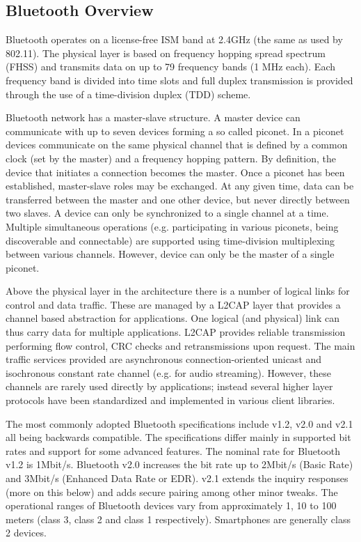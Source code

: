 \subsection{Bluetooth Overview}

Bluetooth operates on a license-free ISM band at 2.4GHz (the same as used by 802.11). The physical layer is based on frequency hopping spread spectrum (FHSS) and transmits data on up to 79 frequency bands (1 MHz each). Each frequency band is divided into time slots and full duplex transmission is provided through the use of a time-division duplex (TDD) scheme.

Bluetooth network has a master-slave structure. A master device can communicate with up to seven devices forming a so called piconet. In a piconet devices communicate on the same physical channel that is defined by a common clock (set by the master) and a frequency hopping pattern. By definition, the device that initiates a connection becomes the master. Once a piconet has been established, master-slave roles may be exchanged. At any given time, data can be transferred between the master and one other device, but never directly between two slaves. A device can only be synchronized to a single channel at a time. Multiple simultaneous operations (e.g. participating in various piconets, being discoverable and connectable) are supported using time-division multiplexing between various channels. However, device can only be the master of a single piconet.

Above the physical layer in the architecture there is a number of logical links for control and data traffic. These are managed by a L2CAP layer that provides a channel based abstraction for applications. One logical (and physical) link can thus carry data for multiple applications. L2CAP provides reliable transmission performing flow control, CRC checks and retransmissions upon request. The main traffic services provided are asynchronous connection-oriented unicast and isochronous constant rate channel (e.g. for audio streaming). However, these channels are rarely used directly by applications; instead several higher layer protocols have been standardized and implemented in various client libraries. 

The most commonly adopted Bluetooth specifications include v1.2, v2.0 and v2.1 all being backwards compatible. The specifications differ mainly in supported bit rates and support for some advanced features. The nominal rate for Bluetooth v1.2 is 1Mbit/s. Bluetooth v2.0 increases the bit rate up to 2Mbit/s (Basic Rate) and 3Mbit/s (Enhanced Data Rate or EDR). v2.1 extends the inquiry responses (more on this below) and adds secure pairing among other minor tweaks. The operational ranges of Bluetooth devices vary from approximately 1, 10 to 100 meters (class 3, class 2 and class 1 respectively). Smartphones are generally class 2 devices.

